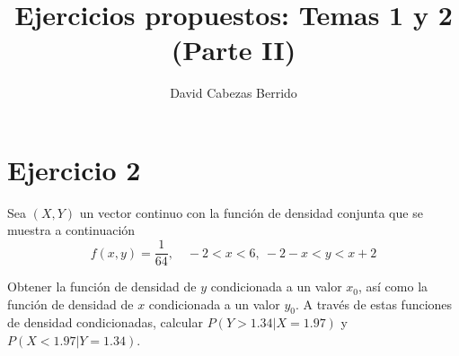 \documentclass[tikz]{article}
\begin{document}
\title{Ejercicios propuestos: Temas 1 y 2 (Parte II)}
\author{David Cabezas Berrido}
\date{}
\maketitle

\section*{Ejercicio 2}

Sea $(X,Y)$ un vector continuo con la función de densidad conjunta que
se muestra a continuación
\[f(x,y)=\frac{1}{64}, \quad -2<x<6,\ -2-x<y<x+2\]

Obtener la función de densidad de $y$ condicionada a un valor $x_0$,
así como la función de densidad de $x$ condicionada a un valor
$y_0$. A través de estas funciones de densidad condicionadas, calcular
$P(Y>1.34|X=1.97)$ y $P(X<1.97|Y=1.34)$.

\begin{center}
\end{center}
\end{document}
